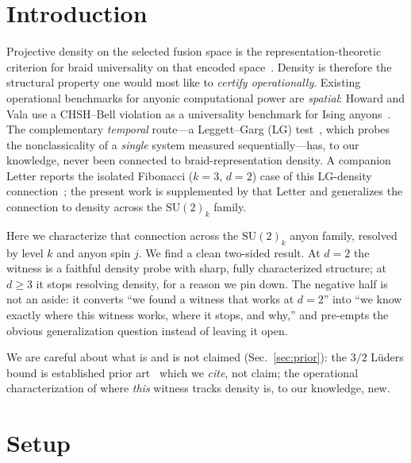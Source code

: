 \documentclass[aps,prx,reprint,amsmath,amssymb,floatfix,nofootinbib,superscriptaddress]{revtex4-2}
\begin{document}
\section{Introduction}
\label{sec:intro}

Projective density on the selected fusion space is the representation-theoretic
criterion for braid universality on that encoded space~\cite{Kup,FLW}. Density is therefore the structural property one would most like
to \emph{certify operationally}. Existing operational benchmarks for anyonic
computational power are \emph{spatial}: Howard and Vala use a CHSH--Bell violation as
a universality benchmark for Ising anyons~\cite{HV}. The complementary \emph{temporal}
route---a Leggett--Garg (LG) test~\cite{LeggettGarg1985,EmaryLambertNori2014}, which
probes the nonclassicality of a \emph{single} system measured sequentially---has, to
our knowledge, never been connected to braid-representation density. A companion
Letter reports the isolated Fibonacci ($k=3$, $d=2$) case of this LG-density
connection~\cite{Sayim2026LGI}; the present work is supplemented by that Letter
and generalizes the connection to density across the
$\mathrm{SU}(2)_k$ family.

Here we characterize that connection across the $\mathrm{SU}(2)_k$ anyon
family, resolved by level $k$ and anyon spin $j$. We find a
clean two-sided result. At $d=2$ the witness is a faithful density probe with sharp,
fully characterized structure; at $d \ge 3$ it stops resolving density, for a reason
we pin down. The negative half is not an aside: it converts ``we found a witness that
works at $d=2$'' into ``we know exactly where this witness works, where it stops, and
why,'' and pre-empts the obvious generalization question instead of leaving it open.

We are careful about what is and is not claimed (Sec.~\ref{sec:prior}): the $3/2$
L\"uders bound is established prior art~\cite{BMKG,BE} which we \emph{cite}, not claim;
the operational characterization of where \emph{this} witness tracks density is, to
our knowledge, new.

\section{Setup}
\label{sec:setup}
\end{document}
